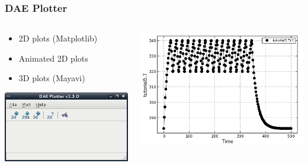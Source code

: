\documentclass{beamer}
\begin{document}
\begin{frame}
\frametitle{DAE Plotter}
\begin{columns}
  \begin{column}{0.5\paperwidth}
    \begin{center}
      \begin{itemize}
	\item 2D plots (Matplotlib)
	\item Animated 2D plots
	\item 3D plots (Mayavi)
      \end{itemize}
    \end{center}
    \begin{center}
      \includegraphics[width=0.35\paperwidth]{../_static/daeplotter.png}
    \end{center}
  \end{column}
  \begin{column}{0.5\paperwidth}
    \begin{center}
      \includegraphics[width=0.35\paperwidth]{../_static/sample_2d_plot.png}
    \end{center}

\end{column}
\end{columns}
\end{frame}
\end{document}
